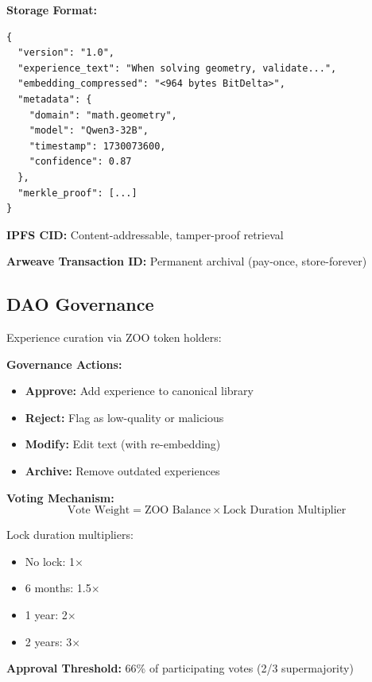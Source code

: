 \textbf{Storage Format:}
\begin{verbatim}
{
  "version": "1.0",
  "experience_text": "When solving geometry, validate...",
  "embedding_compressed": "<964 bytes BitDelta>",
  "metadata": {
    "domain": "math.geometry",
    "model": "Qwen3-32B",
    "timestamp": 1730073600,
    "confidence": 0.87
  },
  "merkle_proof": [...]
}
\end{verbatim}

\textbf{IPFS CID:} Content-addressable, tamper-proof retrieval

\textbf{Arweave Transaction ID:} Permanent archival (pay-once, store-forever)

\subsection{DAO Governance}

Experience curation via ZOO token holders:

\textbf{Governance Actions:}
\begin{itemize}
\item \textbf{Approve:} Add experience to canonical library
\item \textbf{Reject:} Flag as low-quality or malicious
\item \textbf{Modify:} Edit text (with re-embedding)
\item \textbf{Archive:} Remove outdated experiences
\end{itemize}

\textbf{Voting Mechanism:}
\begin{equation}
\text{Vote Weight} = \text{ZOO Balance} \times \text{Lock Duration Multiplier}
\end{equation}

Lock duration multipliers:
\begin{itemize}
\item No lock: 1$\times$
\item 6 months: 1.5$\times$
\item 1 year: 2$\times$
\item 2 years: 3$\times$
\end{itemize}

\textbf{Approval Threshold:} 66\% of participating votes (2/3 supermajority)

